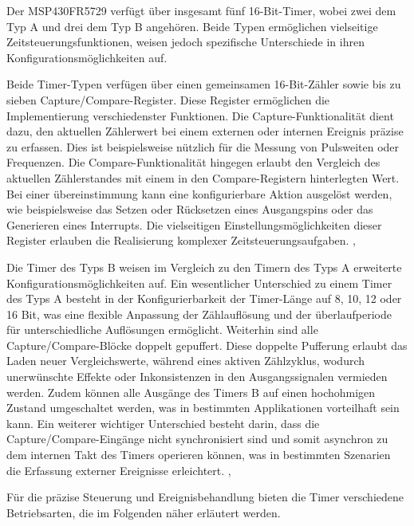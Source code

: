 Der MSP430FR5729 verf\"ugt \"uber insgesamt f\"unf 16-Bit-Timer, wobei zwei dem Typ A und drei dem Typ B angeh\"oren. Beide Typen erm\"oglichen vielseitige Zeitsteuerungsfunktionen, weisen jedoch spezifische Unterschiede in ihren Konfigurationsm\"oglichkeiten auf.

Beide Timer-Typen verf\"ugen \"uber einen gemeinsamen 16-Bit-Z\"ahler sowie bis zu sieben Capture/Compare-Register. Diese Register erm\"oglichen die Implementierung verschiedenster Funktionen. Die Capture-Funktionalit\"at dient dazu, den aktuellen Z\"ahlerwert bei einem externen oder internen Ereignis pr\"azise zu erfassen. Dies ist beispielsweise n\"utzlich f\"ur die Messung von Pulsweiten oder Frequenzen. Die Compare-Funktionalit\"at hingegen erlaubt den Vergleich des aktuellen Z\"ahlerstandes mit einem in den Compare-Registern hinterlegten Wert. Bei einer \"ubereinstimmung kann eine konfigurierbare Aktion ausgel\"ost werden, wie beispielsweise das Setzen oder R\"ucksetzen eines Ausgangspins oder das Generieren eines Interrupts. Die vielseitigen Einstellungsm\"oglichkeiten dieser Register erlauben die Realisierung komplexer Zeitsteuerungsaufgaben. , 

Die Timer des Typs B weisen im Vergleich zu den Timern des Typs A erweiterte Konfigurationsm\"oglichkeiten auf. Ein wesentlicher Unterschied zu einem Timer des Typs A besteht in der Konfigurierbarkeit der Timer-L\"ange auf 8, 10, 12 oder 16 Bit, was eine flexible Anpassung der Z\"ahlaufl\"osung und der \"uberlaufperiode f\"ur unterschiedliche Aufl\"osungen erm\"oglicht. Weiterhin sind alle Capture/Compare-Bl\"ocke doppelt gepuffert. Diese doppelte Pufferung erlaubt das Laden neuer Vergleichswerte, w\"ahrend eines aktiven Z\"ahlzyklus, wodurch unerw\"unschte Effekte oder Inkonsistenzen in den Ausgangssignalen vermieden werden. Zudem k\"onnen alle Ausg\"ange des Timers B auf einen hochohmigen Zustand umgeschaltet werden, was in bestimmten Applikationen vorteilhaft sein kann. Ein weiterer wichtiger Unterschied besteht darin, dass die Capture/Compare-Eing\"ange nicht synchronisiert sind und somit asynchron zu dem internen Takt des Timers operieren k\"onnen, was in bestimmten Szenarien die Erfassung externer Ereignisse erleichtert. , 

F\"ur die pr\"azise Steuerung und Ereignisbehandlung bieten die Timer verschiedene Betriebsarten, die im Folgenden n\"aher erl\"autert werden.

